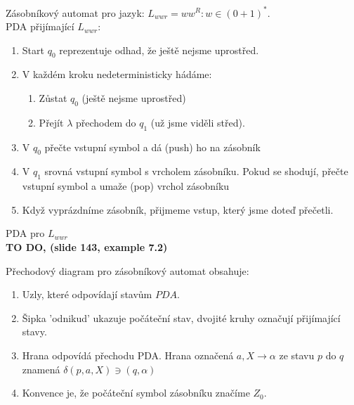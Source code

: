 \documentclass[../main.tex]{subfiles}
\begin{document}
    \begin{example}
        Zásobníkový automat pro jazyk: $L_{wwr} = {ww^R : w \in (0+1)^*}$.\\

        PDA přijímající $L_{wwr}$:
        \begin{enumerate}
            \item Start $q_0$ reprezentuje odhad, že ještě nejsme uprostřed.
            \item V každém kroku nedeterministicky hádáme:
            \begin{enumerate}
                \item Zůstat $q_0$ (ještě nejsme uprostřed)
                \item Přejít $\lambda$ přechodem do $q_1$ (už jsme viděli střed).
            \end{enumerate}
            \item V $q_0$ přečte vstupní symbol a dá (push) ho na zásobník
            \item V $q_1$ srovná vstupní symbol s vrcholem zásobníku. Pokud se shodují,
            přečte vstupní symbol a umaže (pop) vrchol zásobníku
            \item Když vyprázdníme zásobník, přijmeme vstup, který jsme doteď přečetli.
        \end{enumerate}
    \end{example}

    \begin{example}
        PDA pro $L_{wwr}$\\

        \textbf{TO DO, (slide 143, example 7.2)}
    \end{example}

    \begin{definition}
        Přechodový diagram pro zásobníkový automat obsahuje:
        \begin{enumerate}
            \item Uzly, které odpovídají stavům $PDA$.
            \item Šipka 'odnikud' ukazuje počáteční stav, dvojité kruhy označují přijímající stavy.
            \item Hrana odpovídá přechodu PDA. Hrana označená $a, X \rightarrow \alpha$ ze stavu
            $p$ do $q$ znamená $\delta(p,a,X) \ni (q,\alpha)$
            \item Konvence je, že počáteční symbol zásobníku značíme $Z_0$.
        \end{enumerate}
    \end{definition}
\end{document}
